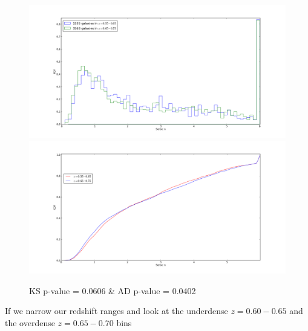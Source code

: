 \documentclass[a4paper,10pt]{article}
\begin{document}
\begin{figure}[ht]
 \centering
 \includegraphics[scale=0.35]{hist_sersicn_ODUD(2).png}
 \includegraphics[scale=0.35]{cdf_sersicn_ODUD(2).png}
 \caption{KS p-value = 0.0606 \& AD p-value = 0.0402}
\end{figure} 

If we narrow our redshift ranges and look at the underdense $z=0.60-0.65$ and the overdense $z=0.65-0.70$ bins \pagebreak
\end{document}
